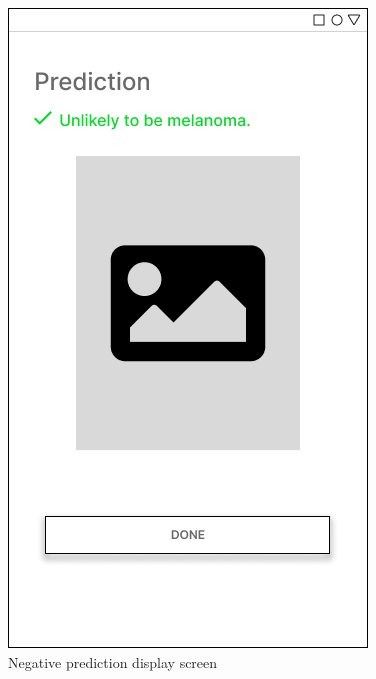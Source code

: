 \documentclass[12pt, a4paper]{article}
\begin{document}
\begin{figure}[h]
    \centering
    \setlength{\fboxsep}{8pt}
    \includegraphics[scale=0.45, fbox]{Prediction-2.png}
    \caption{Negative prediction display screen}
    \label{fig:prediction-2}
\end{figure}
\end{document}
